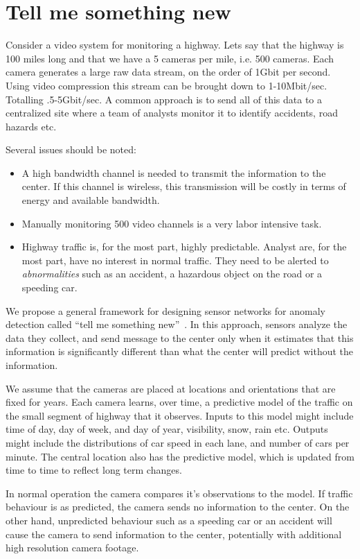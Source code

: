 \section{Tell me something new}\label{sec:TMSN}

Consider a video system for monitoring a highway. Lets say that the
highway is 100 miles long and that we have a 5 cameras per mile,
i.e. 500 cameras. Each camera generates a large raw data stream, on
the order of 1Gbit per second. Using video compression this stream can
be brought down to 1-10Mbit/sec. Totalling .5-5Gbit/sec. A common approach
is to send all of this data to a centralized site where a team of
analysts monitor it to identify accidents, road hazards etc.

Several issues should be noted:
\begin{itemize}
\item A high bandwidth channel is needed to transmit the information
  to the center. If this channel is wireless, this transmission will
  be costly in terms of energy and available bandwidth.
\item Manually monitoring 500 video channels is a very labor intensive task. 
\item Highway traffic is, for the most part, highly
  predictable. Analyst are, for the most part, have no interest in normal traffic. 
  They need to be alerted to {\em abnormalities} such as an accident, a hazardous 
  object on the road or a speeding car.
\end{itemize}

We propose a general framework for designing sensor networks for
anomaly detection called ``tell me something new''~\cite{TMSN}. In
this approach, sensors analyze the data they collect, and send message
to the center only when it estimates that this information is
significantly different than what the center will predict without the
information.

We assume that the cameras are placed at locations and orientations that are fixed for years.
Each camera learns, over time, a predictive model of the traffic on the small segment of 
highway that it observes. Inputs to this model might include time of day, day of week, and day of year, visibility, snow, rain etc. Outputs might include the distributions of car speed in each lane, and number of cars per minute.
The central location also has the predictive model, which is updated from time to time to reflect long term changes. 

In normal operation the camera compares it's observations to the model. If traffic behaviour is as predicted, the camera sends no information to the center. On the other hand, unpredicted behaviour such as a speeding car or an accident will cause the camera to send information to the center, potentially with additional high resolution camera footage.

